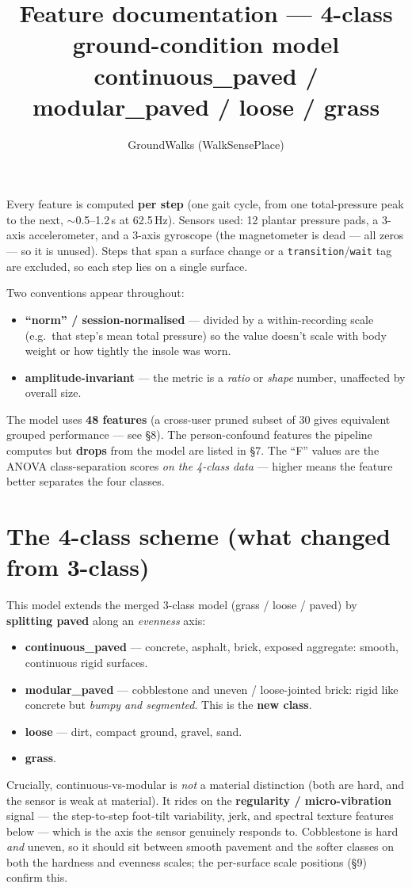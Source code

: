\documentclass[11pt]{article}
\title{\vspace{-1.5em}Feature documentation --- \textbf{4-class} ground-condition model\\[2pt]
\large continuous\_paved / modular\_paved / loose / grass}
\author{GroundWalks (WalkSensePlace)}
\date{}
\newcommand{\cls}[1]{\textbf{#1}}
\begin{document}
\maketitle
\vspace{-2em}

Every feature is computed \textbf{per step} (one gait cycle, from one total-pressure peak to the
next, $\sim$0.5--1.2\,s at 62.5\,Hz). Sensors used: 12 plantar pressure pads, a 3-axis
accelerometer, and a 3-axis gyroscope (the magnetometer is dead --- all zeros --- so it is
unused). Steps that span a surface change or a \texttt{transition}/\texttt{wait} tag are
excluded, so each step lies on a single surface.

Two conventions appear throughout:
\begin{itemize}
\item \textbf{``norm'' / session-normalised} --- divided by a within-recording scale (e.g.\ that
  step's mean total pressure) so the value doesn't scale with body weight or how tightly the
  insole was worn.
\item \textbf{amplitude-invariant} --- the metric is a \emph{ratio} or \emph{shape} number,
  unaffected by overall size.
\end{itemize}

The model uses \textbf{48 features} (a cross-user pruned subset of 30 gives equivalent grouped
performance --- see \S8). The person-confound features the pipeline computes but \textbf{drops}
from the model are listed in \S7. The ``F'' values are the ANOVA class-separation scores
\emph{on the 4-class data} --- higher means the feature better separates the four classes.

\section{The 4-class scheme (what changed from 3-class)}
This model extends the merged 3-class model (grass / loose / paved) by \textbf{splitting paved}
along an \emph{evenness} axis:
\begin{itemize}
\item \cls{continuous\_paved} --- concrete, asphalt, brick, exposed aggregate: smooth, continuous
  rigid surfaces.
\item \cls{modular\_paved} --- cobblestone and uneven / loose-jointed brick: rigid like concrete
  but \emph{bumpy and segmented}. This is the \textbf{new class}.
\item \cls{loose} --- dirt, compact ground, gravel, sand.
\item \cls{grass}.
\end{itemize}
Crucially, continuous-vs-modular is \emph{not} a material distinction (both are hard, and the
sensor is weak at material). It rides on the \textbf{regularity / micro-vibration} signal --- the
step-to-step foot-tilt variability, jerk, and spectral texture features below --- which is the
axis the sensor genuinely responds to. Cobblestone is hard \emph{and} uneven, so it should sit
between smooth pavement and the softer classes on both the hardness and evenness scales; the
per-surface scale positions (\S9) confirm this.
\end{document}

